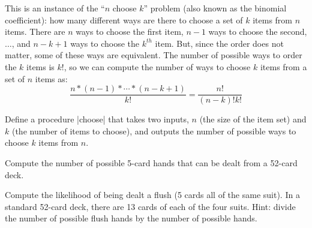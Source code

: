 \begin{schemeregion}
\begin{exercise}
This is an instance of the ``$n$ choose $k$'' problem (also known as the binomial coefficient): how many different ways are there to choose a set of $k$ items from $n$ items.  There are $n$ ways to choose the first item, $n - 1$ ways to choose the second, $\ldots$, and $n - k + 1$ ways to choose the $k^{th}$ item.  But, since the order does not matter, some of these ways are equivalent.  The number of possible ways to order the $k$ items is $k!$, so we can compute the number of ways to choose $k$ items from a set of $n$ items as:
\[
\frac{n * (n - 1) * \cdots * (n - k + 1)}{k!} = \frac{n!}{(n-k)!k!}
\]
\begin{subexerciselist}
\item \greenstar Define a procedure \scheme|choose| that takes two inputs, $n$ (the size of the item set) and $k$ (the number of items to choose), and outputs the number of possible ways to choose $k$ items from $n$.
\item \bluestar Compute the number of possible 5-card hands that can be dealt from a 52-card deck.
\item \goldstar Compute the likelihood of being dealt a flush (5 cards all of the same suit).  In a standard 52-card deck, there are 13 cards of each of the four suits.  Hint: divide the number of possible flush hands by the number of possible hands.
\end{subexerciselist}
\end{exercise}
\afterex


\end{schemeregion}
